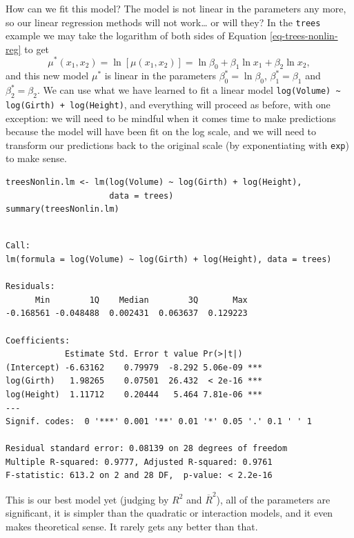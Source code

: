 \documentclass[captions=tableheading]{scrbook}
\begin{document}
How can we fit this model? The model is not linear in the parameters any more, so our linear regression methods will not work\ldots{} or will they? In the \texttt{trees} example we may take the logarithm of both sides of Equation \ref{eq-trees-nonlin-reg} to get
\begin{equation}
\mu^{\ast}(x_{1},x_{2})=\ln\left[\mu(x_{1},x_{2})\right]=\ln\beta_{0}+\beta_{1}\ln x_{1}+\beta_{2}\ln x_{2},
\end{equation}
and this new model \(\mu^{\ast}\) is linear in the parameters \(\beta_{0}^{\ast}=\ln\beta_{0}\), \(\beta_{1}^{\ast}=\beta_{1}\) and \(\beta_{2}^{\ast}=\beta_{2}\). We can use what we have learned to fit a linear model \texttt{log(Volume) \textasciitilde{} log(Girth) + log(Height)}, and everything will proceed as before, with one exception: we will need to be mindful when it comes time to make predictions because the model will have been fit on the log scale, and we will need to transform our predictions back to the original scale (by exponentiating with \texttt{exp}) to make sense.


\lstset{language=R}
\begin{lstlisting}
treesNonlin.lm <- lm(log(Volume) ~ log(Girth) + log(Height), 
                     data = trees)
summary(treesNonlin.lm)
\end{lstlisting}


\begin{verbatim}
 
Call:
lm(formula = log(Volume) ~ log(Girth) + log(Height), data = trees)

Residuals:
      Min        1Q    Median        3Q       Max 
-0.168561 -0.048488  0.002431  0.063637  0.129223 

Coefficients:
            Estimate Std. Error t value Pr(>|t|)    
(Intercept) -6.63162    0.79979  -8.292 5.06e-09 ***
log(Girth)   1.98265    0.07501  26.432  < 2e-16 ***
log(Height)  1.11712    0.20444   5.464 7.81e-06 ***
---
Signif. codes:  0 '***' 0.001 '**' 0.01 '*' 0.05 '.' 0.1 ' ' 1 

Residual standard error: 0.08139 on 28 degrees of freedom
Multiple R-squared: 0.9777,	Adjusted R-squared: 0.9761 
F-statistic: 613.2 on 2 and 28 DF,  p-value: < 2.2e-16
\end{verbatim}

This is our best model yet (judging by \(R^{2}\) and \(\overline{R}^{2}\)), all of the parameters are significant, it is simpler than the quadratic or interaction models, and it even makes theoretical sense. It rarely gets any better than that.
\end{document}
